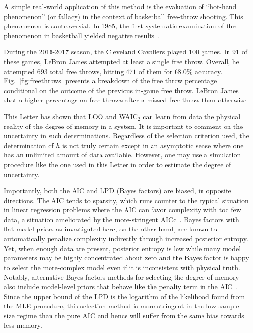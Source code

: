\documentclass[prl,twocolumn,groupedaddress]{revtex4-1}
\begin{document}
A simple real-world application of this method is the evaluation of ``hot-hand phenomenon'' (or fallacy) in the context of basketball free-throw shooting. This phenomenon is controversial. In 1985, the first systematic examination of the phenomenon in basketball yielded negative results~\cite{gilovich1985hot}.

  During the 2016-2017 season, the Cleveland Cavaliers played $100$ games. In $91$ of these games, LeBron James attempted at least a single free throw. Overall, he attempted $693$ total free throws, hitting $471$ of them for $68.0\%$ accuracy. Fig.~\ref{fig:freethrows} presents a breakdown of the free throw percentage conditional on the outcome of the previous in-game free throw. LeBron James shot a higher percentage on free throws after a missed free throw than otherwise.
  
  \cite{burns2001hot}\cite{miller2016surprised}\cite{bocskocsky2014hot}\cite{arkes2010revisiting}

This Letter has shown that LOO and WAIC$_2$ can learn from data the physical reality of the 
degree of memory in a system. It is important to comment on the uncertainty in such determinations. Regardless of the selection criterion used, the determination of $h$ is not truly certain except in an asymptotic sense where one has an unlimited amount of data available. However, one may use a simulation procedure like the one used in this Letter in order to estimate the degree of uncertainty.  

Importantly,   both the AIC and LPD (Bayes factors) are biased, in opposite directions. The AIC tends to sparsity, which runs counter to the typical situation in linear regression problems where the AIC can favor complexity with too few data, a situation ameliorated by the more-stringent AICc~\cite{claeskens2008model}. Bayes factors with flat model  priors as investigated here, on the other hand, are known to automatically penalize complexity indirectly through increased posterior entropy. Yet, when enough data are present, posterior entropy is low while many model parameters may be highly concentrated about zero and the Bayes factor is happy to select the more-complex model even if it is inconsistent with physical truth.
%
Notably, alternative Bayes factors methods for selecting the degree of memory also include model-level priors that behave like the penalty term in the AIC~\cite{strelioff2007inferring,singer2014detecting}. Since the upper bound of the LPD is the logarithm of the likelihood found from the MLE procedure, this selection method is more stringent in the low sample-size regime than the pure AIC and hence will suffer from the same bias towards less memory.
\end{document}

